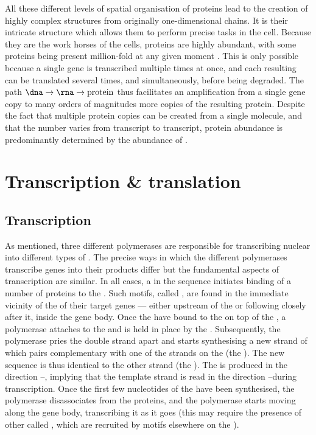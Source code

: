 All these different levels of spatial organisation of proteins lead to the
creation of highly complex structures from originally one-dimensional chains. It
is their intricate structure which allows them to perform precise tasks in the
cell. Because they are the work horses of the cells, proteins are highly
abundant, with some proteins being present million-fold at any given moment
\citep{Milo:2013}. This is only possible because a single gene is transcribed
multiple times at once, and each resulting \mrna can be translated several
times, and simultaneously, before being degraded. The path
\(\text{\dna}\rightarrow\text{\rna}\rightarrow\text{protein}\) thus facilitates
an amplification from a single gene copy to many orders of magnitudes more
copies of the resulting protein. Despite the fact that multiple protein copies
can be created from a single \mrna molecule, and that the number varies from
transcript to transcript, protein abundance is predominantly determined by the
abundance of \mrna[s] \citep{Li:2014,Jovanovic:2015,Csardi:2014}.

\section{Transcription \& translation}

\subsection{Transcription}

As mentioned, three different polymerases are responsible for transcribing
nuclear \dna into different types of \rna. The precise ways in which the
different polymerases transcribe genes into their \rna products differ but the
fundamental aspects of transcription are similar. In all cases, a
 in the \dna sequence
initiates binding of a number of \tf proteins to the \dna. Such motifs, called
, are found in the immediate vicinity of the \tss of their
target genes --- either upstream of the \tss or following closely after it,
inside the gene body. Once the \tf[s] have bound to the \dna on top of the \tss,
a polymerase attaches to the \dna and is held in place by the \tf[s].
Subsequently, the polymerase pries the double strand apart and starts
synthesising a new strand of \rna which pairs complementary with one of the
strands on the \dna (the ). The new \rna[’s] sequence is
thus identical to the other \dna strand (the ). The \rna
is produced in the direction \fivep--\threep, implying that the template strand
is read in the direction \threep--\fivep during transcription. Once the first
few nucleotides of the \rna have been synthesised, the polymerase disassociates
from the \tf proteins, and the polymerase starts moving along the gene body,
transcribing it as it goes (this may require the presence of other \tf[s] called
, which are recruited by  motifs elsewhere
on the \dna).

